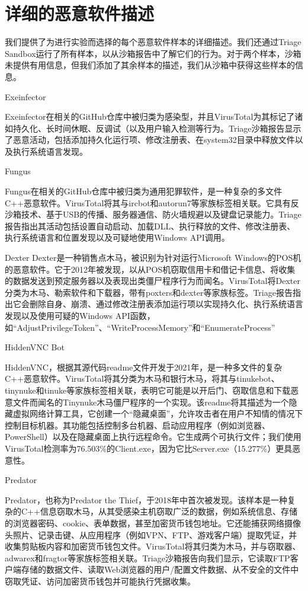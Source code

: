 \chapter{详细的恶意软件描述}
我们提供了为进行实验而选择的每个恶意软件样本的详细描述。我们还通过Triage Sandbox运行了所有样本，以从沙箱报告中了解它们的行为。对于两个样本，沙箱未提供有用信息，但我们添加了其余样本的描述，我们从沙箱中获得这些样本的信息。

Exeinfector

Exeinfector在相关的GitHub仓库\parencite{Cryptware2024}中被归类为感染型，并且VirusTotal为其标记了诸如持久化、长时间休眠、反调试（以及用户输入检测等行为。Triage沙箱报告显示了恶意活动，包括添加持久化运行项、修改注册表、在system32目录中释放文件以及执行系统语言发现。

Fungus

Fungus在相关的GitHub仓库\parencite{Cryptware2024}中被归类为通用犯罪软件，是一种复杂的多文件C++恶意软件。VirusTotal将其与ircbot和autorun7等家族标签相关联。它具有反沙箱技术、基于USB的传播、服务器通信、防火墙规避以及键盘记录能力。Triage报告指出其活动包括设置自动启动、加载DLL、执行释放的文件、修改注册表、执行系统语言和位置发现以及可疑地使用Windows API调用。

Dexter
Dexter是一种销售点木马，被识别为针对运行Microsoft Windows的POS机的恶意软件\parencite{Wikipedia2024Dexter}。它于2012年被发现，以从POS机窃取信用卡和借记卡信息、将收集的数据发送到预定服务器以及表现出类僵尸程序行为而闻名\parencite{MalwareBytes2024POS}。VirusTotal将Dexter分类为木马、勒索软件和下载器，带有poxters和dexter等家族标签。Triage报告指出它会删除自身、崩溃、通过修改注册表添加运行项以实现持久化、执行系统语言发现以及使用可疑的Windows API函数，如“AdjustPrivilegeToken”、“WriteProcessMemory”和“EnumerateProcess”

HiddenVNC Bot

HiddenVNC，根据其源代码readme文件开发于2021年，是一种多文件的复杂C++恶意软件。VirusTotal将其分类为木马和银行木马，将其与tinukebot、tinynuke和tinuke等家族标签相关联，表明它可能是以开后门、窃取信息和下载恶意文件而闻名的Tinynuke木马僵尸程序的一个实现\parencite{MalwareBytes2024Tinukebot}。该readme将其描述为一个隐藏虚拟网络计算工具，它创建一个“隐藏桌面”，允许攻击者在用户不知情的情况下控制目标机器。其功能包括控制多台机器、启动应用程序（例如浏览器、PowerShell）以及在隐藏桌面上执行远程命令。它生成两个可执行文件；我们使用VirusTotal检测率为76.503\%的Client.exe，因为它比Server.exe（15.277\%）更具恶意性。

Predator

Predator，也称为Predator the Thief，于2018年中首次被发现\parencite{Fortinet2019Predator}。该样本是一种复杂的C++信息窃取木马，从其受感染主机窃取广泛的数据，例如系统信息、存储的浏览器密码、cookie、表单数据，甚至加密货币钱包地址\parencite{Fortinet2019Predator}。它还能捕获网络摄像头照片、记录击键、从应用程序（例如VPN、FTP、游戏客户端）提取凭证，并收集剪贴板内容和加密货币钱包文件\parencite{Fortinet2019Trojan}。VirusTotal将其归类为木马，并与窃取器、adwarex和fragtor等家族标签相关联。Triage沙箱报告向我们显示，它读取FTP客户端存储的数据文件、读取Web浏览器的用户/配置文件数据、从不安全的文件中窃取凭证、访问加密货币钱包并可能执行凭据收集。

